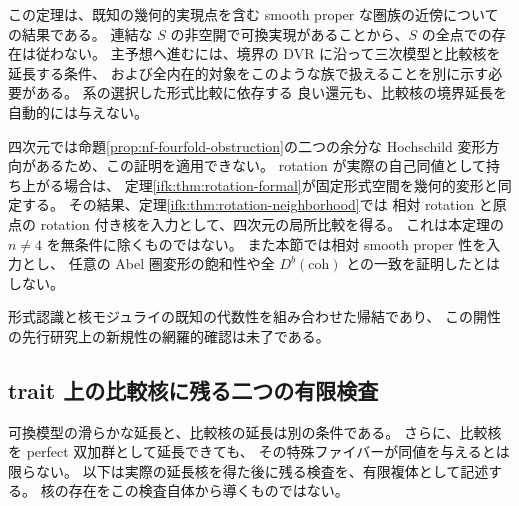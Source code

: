 \begin{remark}[主予想への寄与と残る障害]
\label{grl:rem:scope}
この定理は、既知の幾何的実現点を含む smooth proper な圏族の近傍についての結果である。
連結な $S$ の非空開で可換実現があることから、$S$ の全点での存在は従わない。
主予想へ進むには、境界の DVR に沿って三次模型と比較核を延長する条件、
および全内在的対象をこのような族で扱えることを別に示す必要がある。
系の選択した形式比較に依存する
良い還元も、比較核の境界延長を自動的には与えない。

四次元では命題\ref{prop:nf-fourfold-obstruction}の二つの余分な
Hochschild 変形方向があるため、この証明を適用できない。
rotation が実際の自己同値として持ち上がる場合は、
定理\ref{ifk:thm:rotation-formal}が固定形式空間を幾何的変形と同定する。
その結果、定理\ref{ifk:thm:rotation-neighborhood}では
相対 rotation と原点の rotation 付き核を入力として、四次元の局所比較を得る。
これは本定理の $n\ne4$ を無条件に除くものではない。
また本節では相対 smooth proper 性を入力とし、
任意の Abel 圏変形の飽和性や全 $D^b(\mathrm{coh})$ との一致を証明したとはしない。

形式認識と核モジュライの既知の代数性を組み合わせた帰結であり、
この開性の先行研究上の新規性の網羅的確認は未了である。
\end{remark}

\subsection{trait 上の比較核に残る二つの有限検査}

可換模型の滑らかな延長と、比較核の延長は別の条件である。
さらに、比較核を perfect 双加群として延長できても、
その特殊ファイバーが同値を与えるとは限らない。
以下は実際の延長核を得た後に残る検査を、有限複体として記述する。
核の存在をこの検査自体から導くものではない。

